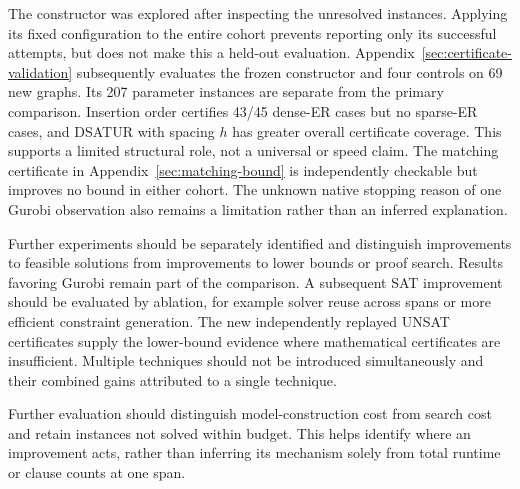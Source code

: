The constructor was explored after inspecting the unresolved instances.
Applying its fixed configuration to the entire cohort prevents reporting
only its successful attempts, but does not make this a held-out evaluation.
Appendix~\ref{sec:certificate-validation} subsequently evaluates the frozen
constructor and four controls on 69 new graphs. Its 207 parameter instances
are separate from the primary comparison. Insertion order certifies
43/45 dense-ER cases but no sparse-ER cases, and DSATUR with spacing $h$
has greater overall certificate coverage. This supports a limited
structural role, not a universal or speed claim. The matching certificate
in Appendix~\ref{sec:matching-bound} is independently checkable but
improves no bound in either cohort. The unknown native stopping reason of one Gurobi observation also
remains a limitation rather than an inferred explanation.

Further experiments should be separately identified and distinguish
improvements to feasible solutions from improvements to lower bounds or
proof search. Results favoring Gurobi remain part of the comparison.
A subsequent SAT improvement should be evaluated by ablation, for example
solver reuse across spans or more efficient constraint generation. The new independently replayed UNSAT certificates supply the lower-bound
evidence where mathematical certificates are insufficient. Multiple techniques should not be
introduced simultaneously and their combined gains attributed to a single technique.

Further evaluation should distinguish model-construction cost from search
cost and retain instances not solved within budget. This helps identify
where an improvement acts, rather than inferring its mechanism solely
from total runtime or clause counts at one span.

